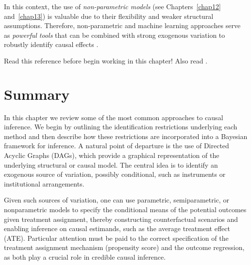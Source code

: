 In this context, the use of \textit{non-parametric models} (see Chapters~\ref{chap12} and~\ref{chap13}) is valuable due to their flexibility and weaker structural assumptions. Therefore, non-parametric and machine learning approaches serve as \textit{powerful tools} that can be combined with strong exogenous variation to robustly identify causal effects \cite{chernozhukov2018double,chernozhukov2024applied}.

Read this reference \cite{iacovone2023bayesian} before begin working in this chapter! Also read \cite{imbens1997bayesian}.



\section{Summary}

In this chapter we review some of the most common approaches to causal inference. We begin by outlining the identification restrictions underlying each method and then describe how these restrictions are incorporated into a Bayesian framework for inference. A natural point of departure is the use of Directed Acyclic Graphs (DAGs), which provide a graphical representation of the underlying structural or causal model. The central idea is to identify an exogenous source of variation, possibly conditional, such as instruments or institutional arrangements. 

Given such sources of variation, one can use parametric, semiparametric, or nonparametric models to specify the conditional means of the potential outcomes given treatment assignment, thereby constructing counterfactual scenarios and enabling inference on causal estimands, such as the average treatment effect (ATE). Particular attention must be paid to the correct specification of the treatment assignment mechanism (propensity score) and the outcome regression, as both play a crucial role in credible causal inference. 

